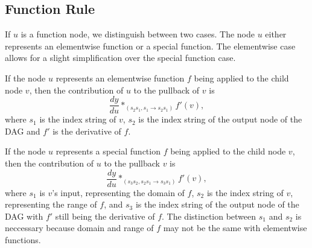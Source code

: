 \documentclass[12pt, a4paper]{report}
\begin{document}
\subsection{Function Rule}
If $u$ is a function node, we distinguish between two cases.
The node $u$ either represents an elementwise function or a special function.
The elementwise case allows for a slight simplification over the special function case.

If the node $u$ represents an elementwise function $f$ being applied to the child node $v$, then the contribution of $u$ to the pullback of $v$ is 
$$
\frac{dy}{du} *_{(s_2s_1,s_1 \rightarrow s_2s_1)} f'(v),
$$
where $s_1$ is the index string of $v$, $s_2$ is the index string of the output node of the DAG and $f'$ is the derivative of $f$.

If the node $u$ represents a special function $f$ being applied to the child node $v$, then the contribution of $u$ to the pullback $v$ is
$$
\frac{dy}{du} *_{(s_3s_2,s_2s_1 \rightarrow s_3s_1)} f'(v),
$$
where $s_1$ is $v$'s input, representing the domain of $f$, $s_2$ is the index string of $v$, representing the range of $f$, and $s_3$ is the index string of the output node of the DAG with $f'$ still being the derivative of $f$.
The distinction between $s_1$ and $s_2$ is neccessary because domain and range of $f$ may not be the same with elementwise functions.
\end{document}
